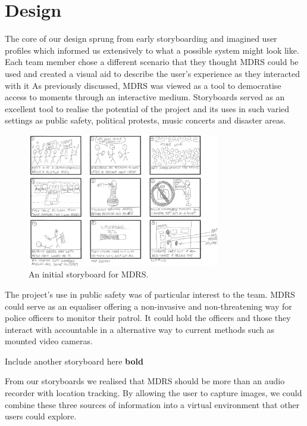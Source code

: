 \documentclass{l3proj}
\begin{document}
\chapter{Design}
\label{design}

The core of our design sprung from early storyboarding and imagined user
profiles which informed us extensively to what a possible system might look
like. Each team member chose a different scenario that they thought MDRS could be used and created a visual aid to describe the user's experience as they interacted with it As previously discussed, MDRS was viewed as a tool to democratise access to moments through an interactive medium. Storyboards served as an excellent tool to realise the potential of the project and its uses in such varied settings as public safety, political protests, music concerts and disaster areas.

\begin{figure}[ht!]
  \centering
\includegraphics[width=0.75\textwidth]{images/ally-storyboard.jpg}
\caption{An initial storyboard for MDRS.}
\end{figure}

The project's use in public safety was of particular interest to the team. MDRS could serve as an equaliser offering a non-invasive and non-threatening way for police officers to monitor their patrol. It could hold the officers and those they interact with accountable in a alternative way to current methods such as mounted video cameras.

Include another storyboard here {\bf bold}

From our storyboards we realised that MDRS should be more than an audio recorder with location tracking. By allowing the user to capture images, we could combine these three sources of information into a virtual environment that other users could explore.
\end{document}

